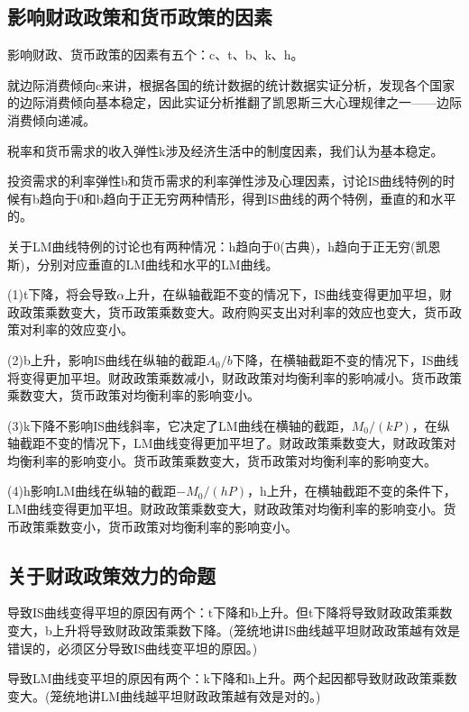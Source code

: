 \documentclass{article}
\begin{document}
\subsection{影响财政政策和货币政策的因素}
影响财政、货币政策的因素有五个：c、t、b、k、h。

就边际消费倾向c来讲，根据各国的统计数据的统计数据实证分析，发现各个国家的边际消费倾向基本稳定，因此实证分析推翻了凯恩斯三大心理规律之一——边际消费倾向递减。

税率和货币需求的收入弹性k涉及经济生活中的制度因素，我们认为基本稳定。

投资需求的利率弹性b和货币需求的利率弹性涉及心理因素，讨论IS曲线特例的时候有b趋向于0和b趋向于正无穷两种情形，得到IS曲线的两个特例，垂直的和水平的。

关于LM曲线特例的讨论也有两种情况：h趋向于0(古典)，h趋向于正无穷(凯恩斯)，分别对应垂直的LM曲线和水平的LM曲线。

\hspace*{\fill}

(1)t下降，将会导致$ \alpha $上升，在纵轴截距不变的情况下，IS曲线变得更加平坦，财政政策乘数变大，货币政策乘数变大。政府购买支出对利率的效应也变大，货币政策对利率的效应变小。

(2)b上升，影响IS曲线在纵轴的截距$ A_0/b $下降，在横轴截距不变的情况下，IS曲线将变得更加平坦。财政政策乘数减小，财政政策对均衡利率的影响减小。货币政策乘数变大，货币政策对均衡利率的影响变小。

(3)k下降不影响IS曲线斜率，它决定了LM曲线在横轴的截距，$ M_0/(kP) $，在纵轴截距不变的情况下，LM曲线变得更加平坦了。财政政策乘数变大，财政政策对均衡利率的影响变小。货币政策乘数变大，货币政策对均衡利率的影响变大。

(4)h影响LM曲线在纵轴的截距$ -M_0/(hP) $，h上升，在横轴截距不变的条件下，LM曲线变得更加平坦。财政政策乘数变大，财政政策对均衡利率的影响变小。货币政策乘数变小，货币政策对均衡利率的影响变小。

\subsection{关于财政政策效力的命题}
导致IS曲线变得平坦的原因有两个：t下降和b上升。但t下降将导致财政政策乘数变大，b上升将导致财政政策乘数下降。(笼统地讲IS曲线越平坦财政政策越有效是错误的，必须区分导致IS曲线变平坦的原因。)

导致LM曲线变平坦的原因有两个：k下降和h上升。两个起因都导致财政政策乘数变大。(笼统地讲LM曲线越平坦财政政策越有效是对的。)

\hspace*{\fill}
\end{document}
